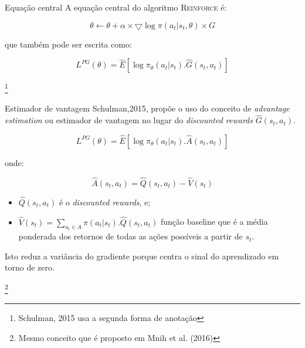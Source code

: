 \documentclass{beamer}
\begin{document}
\begin{frame}{Equação central}
	A equação central do algoritmo \textsc{Reinforce} é: 
	
	\begin{equation}
		\theta \leftarrow \theta + \alpha \times \bigtriangledown \log \pi(a_{t}|s_{t}, \theta) \times G
	\end{equation}

	que também pode ser escrita como: 
	
	\begin{equation}
		L^{PG}(\theta) = \hat{E} \left[ \log \pi_{\theta}(a_{t}|s_{t}).\hat{G}(s_{t},a_{t}) \right]
	\end{equation}
	
	\footnote{Schulman, 2015 usa a segunda forma de anotação}
	
\end{frame}

\begin{frame}{Estimador de vantagem}
	Schulman,2015, propõe o uso do conceito de \textit{advantage estimation} ou estimador de vantagem no lugar do \textit{discounted rewards} $\hat{G}(s_{t},a_{t})$. 
	
	\begin{equation}
	L^{PG}(\theta) = \hat{E} \left[ \log \pi_{\theta}(a_{t}|s_{t}).\hat{A}(s_{t},a_{t}) \right]
	\end{equation}	
	
	onde: 
	
	\begin{equation}
		\hat{A}(s_{t},a_{t}) = \hat{Q}(s_{t},a_{t}) - \hat{V}(s_{t})
	\end{equation}

\begin{itemize}
	\item $\hat{Q}(s_{t},a_{t})$ é o \textit{discounted rewards}, e;
	\item $\hat{V}(s_{t}) = \sum_{a_{t} \in A} \pi (a_{t}|s_{t}).\hat{Q}(s_{t},a_{t})$ função baseline que é a média ponderada dos retornos de todas as ações possíveis a partir de $s_t$.
\end{itemize}	

\vspace{0.5cm}

Isto reduz a variância do gradiente porque centra o sinal do aprendizado em torno de zero. 

\footnote{Mesmo conceito que é proposto em Mnih et al. (2016)}

\end{frame}
\end{document}
